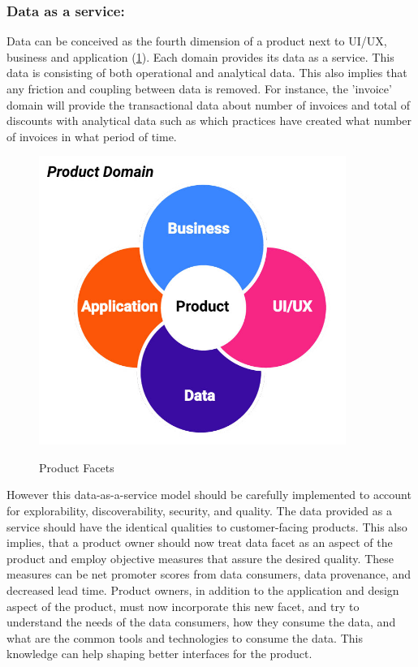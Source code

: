 \documentclass[review]{elsarticle}
\begin{document}
\subsubsection{Data as a service:}

Data can be conceived as the fourth dimension of a product next to UI/UX, business and application (\ref{data-facets}). Each domain provides its data as a service. This data is consisting of both operational and analytical data. This also implies that any friction and coupling between data is removed. For instance, the 'invoice' domain will provide the transactional data about number of invoices and total of discounts with analytical data such as which practices have created what number of invoices in what period of time.

\begin{figure}[h!]
    \centering
    \includegraphics[width=10cm]{Media/product-facets.jpg}
    \label{data-facets}
    \caption{Product Facets}
\end{figure}

However this data-as-a-service model should be carefully implemented to account for explorability, discoverability, security, and quality. The data provided as a service should have the identical qualities to customer-facing products. This also implies, that a product owner should now treat data facet as an aspect of the product and employ objective measures that assure the desired quality. These measures can be net promoter scores from data consumers, data provenance, and decreased lead time. Product owners, in addition to the application and design aspect of the product, must now incorporate this new facet, and try to understand the needs of the data consumers, how they consume the data, and what are the common tools and technologies to consume the data. This knowledge can help shaping better interfaces for the product.
\end{document}
